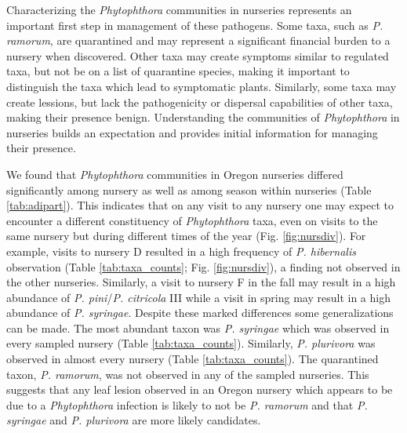 \documentclass[12pt]{article}
\begin{document}
Characterizing the \emph{Phytophthora} communities in nurseries represents an important first step in management of these pathogens.  Some taxa, such as \emph{P. ramorum}, are quarantined and may represent a significant financial burden to a nursery when discovered.  Other taxa may create symptoms similar to regulated taxa, but not be on a list of quarantine species, making it important to distinguish the taxa which lead to symptomatic plants.  Similarly, some taxa may create lessions, but lack the pathogenicity or dispersal capabilities of other taxa, making their presence benign.  Understanding the communities of \emph{Phytophthora} in nurseries builds an expectation and provides initial information for managing their presence.

We found that \emph{Phytophthora} communities in Oregon nurseries differed significantly among nursery as well as among season within nurseries (Table \ref{tab:adipart}).  This indicates that on any visit to any nursery one may expect to encounter a different constituency of \emph{Phytophthora} taxa, even on visits to the same nursery but during different times of the year (Fig. \ref{fig:nursdiv}).  For example, visits to nursery D resulted in a high frequency of \emph{P. hibernalis} observation (Table \ref{tab:taxa_counts}; Fig. \ref{fig:nursdiv}), a finding not observed in the other nurseries.  Similarly, a visit to nursery F in the fall may result in a high abundance of \emph{P. pini}/\emph{P. citricola} III while a visit in spring may result in a high abundance of \emph{P. syringae}.  Despite these marked differences some generalizations can be made.  The most abundant taxon was \emph{P. syringae} which was observed in every sampled nursery (Table \ref{tab:taxa_counts}).  Similarly, \emph{P. plurivora} was observed in almost every nursery (Table \ref{tab:taxa_counts}).  The quarantined taxon, \emph{P. ramorum}, was not observed in any of the sampled nurseries.  This suggests that any leaf lesion observed in an Oregon nursery which appears to be due to a \emph{Phytophthora} infection is likely to not be \emph{P. ramorum} and that \emph{P. syringae} and \emph{P. plurivora} are more likely candidates.
\end{document}
